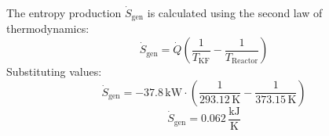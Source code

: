The entropy production \( \dot{S}_{\text{gen}} \) is calculated using the second law of thermodynamics:  
\[
\dot{S}_{\text{gen}} = \dot{Q} \left( \frac{1}{T_{\text{KF}}} - \frac{1}{T_{\text{Reactor}}} \right)
\]  
Substituting values:  
\[
\dot{S}_{\text{gen}} = -37.8 \, \text{kW} \cdot \left( \frac{1}{293.12 \, \text{K}} - \frac{1}{373.15 \, \text{K}} \right)
\]  
\[
\dot{S}_{\text{gen}} = 0.062 \, \frac{\text{kJ}}{\text{K}}
\]